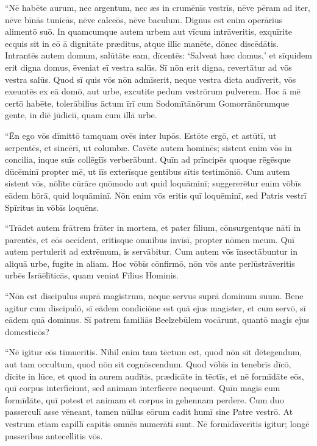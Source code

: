 \Versus ``Nē habēte aurum, nec argentum, nec æs in crumēnīs vestrīs, 
\Versus nēve pēram ad iter, nēve bīnās tunicās, nēve calceōs, nēve baculum. Dignus est enim operārius alimentō suō. 
\Versus In quamcumque autem urbem aut vīcum intrāveritis, exquīrite ecquis sit in eō ā dignitāte præditus, atque illīc manēte, dōnec discēdātis. 
\Versus Intrantēs autem domum, salūtāte eam, dīcentēs: `Salveat hæc domus,' 
\Versus et sīquidem erit digna domus, ēveniat eī vestra salūs. Sī nōn erit digna, revertātur ad vōs vestra salūs. 
\Versus Quod sī quis vōs nōn admīserit, neque vestra dicta audīverit, vōs exeuntēs ex eā domō, aut urbe, excutite pedum vestrōrum pulverem. 
\Versus Hoc ā mē certō habēte, tolerābilius āctum īrī cum Sodomītānōrum Gomorrānōrumque gente, in diē jūdiciī, quam cum illā urbe.

\Versus ``Ēn ego vōs dīmittō tamquam ovēs inter lupōs. Estōte ergō, et astūtī, ut serpentēs, et sincērī, ut columbæ. 
\Versus Cavēte autem hominēs; sistent enim vōs in concilia, inque suīs collēgiīs verberābunt. 
\Versus Quīn ad prīncipēs quoque rēgēsque dūcēminī propter mē, ut iīs exterīsque gentibus sītis testimōniō. 
\Versus Cum autem sistent vōs, nōlīte cūrāre quōmodo aut quid loquāminī; suggererētur enim vōbīs eādem hōrā, quid loquāminī. 
\Versus Nōn enim vōs eritis quī loquēminī, sed Patris vestrī Spīritus in vōbīs loquēns.

\Versus ``Trādet autem frātrem frāter in mortem, et pater fīlium, cōnsurgentque nātī in parentēs, et eōs occīdent, 
\Versus eritisque omnibus invīsī, propter nōmen meum. Quī autem pertulerit ad extrēmum, is servābitur. 
\Versus Cum autem vōs īnsectābuntur in aliquā urbe, fugite in aliam. Hoc vōbīs cōnfirmō, nōn vōs ante perlūstrāveritis urbēs Isrāēlīticās, quam veniat Fīlius Hominis.

\Versus ``Nōn est discipulus suprā magistrum, neque servus suprā dominum suum. 
\Versus Bene agitur cum discipulō, sī eādem condiciōne est quā ejus magister, et cum servō, sī eādem quā dominus. Sī patrem familiās Beelzebūlem vocārunt, quantō magis ejus domesticōs?

\Versus ``Nē igitur eōs timuerītis. Nihil enim tam tēctum est, quod nōn sit dētegendum, aut tam occultum, quod nōn sit cognōscendum. 
\Versus Quod vōbīs in tenebrīs dīcō, dīcite in lūce, et quod in aurem audītis, prædicāte in tēctīs, 
\Versus et nē formīdāte eōs, quī corpus interficiunt, sed animam interficere nequeunt. Quīn magis eum formīdāte, quī potest et animam et corpus in gehennam perdere. 
\Versus Cum duo passerculī asse vēneant, tamen nūllus eōrum cadit humī sine Patre vestrō. 
\Versus At vestrum etiam capillī capitis omnēs numerātī sunt. 
\Versus Nē formīdāverītis igitur; longē passeribus antecellitis vōs.

